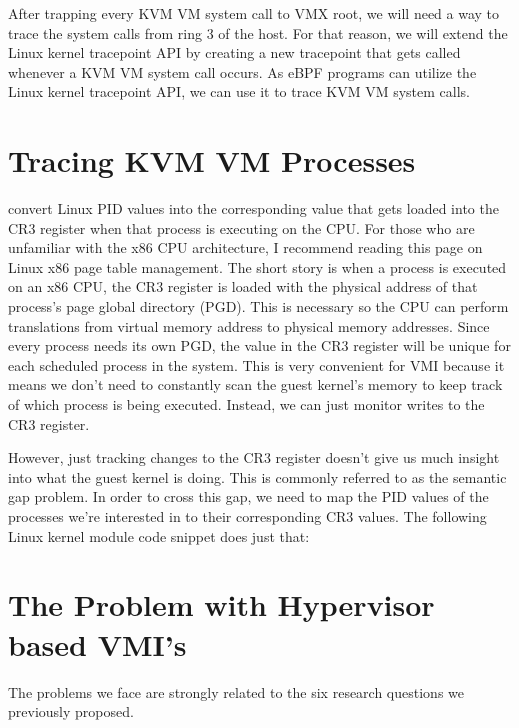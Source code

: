 \documentclass{report}
\begin{document}
\begin{spacing}{1.5}
{\leavevmode\newline
}

{\large
After trapping every KVM VM system call to VMX root, we  will need a way to trace the system calls from ring 3 of the host. For that reason, we will extend the Linux kernel tracepoint API by creating a new tracepoint that gets called whenever a KVM VM system call occurs. As eBPF programs can utilize the Linux kernel tracepoint API, we can use it to trace KVM VM system calls.  
\leavevmode\newline
}





\section{Tracing KVM VM Processes}

{\large
convert Linux PID values into the corresponding value that gets loaded into the CR3 register when that process is executing on the CPU. For those who are unfamiliar with the x86 CPU architecture, I recommend reading this page on Linux x86 page table management. The short story is when a process is executed on an x86 CPU, the CR3 register is loaded with the physical address of that process's page global directory (PGD). This is necessary so the CPU can perform translations from virtual memory address to physical memory addresses. Since every process needs its own PGD, the value in the CR3 register will be unique for each scheduled process in the system. This is very convenient for VMI because it means we don't need to constantly scan the guest kernel's memory to keep track of which process is being executed. Instead, we can just monitor writes to the CR3 register.

However, just tracking changes to the CR3 register doesn't give us much insight into what the guest kernel is doing. This is commonly referred to as the semantic gap problem. In order to cross this gap, we need to map the PID values of the processes we're interested in to their corresponding CR3 values. The following Linux kernel module code snippet does just that:
\newline
}




\section{The Problem with Hypervisor based VMI's}

{\large
The problems we face are strongly related to the six research questions we previously proposed.
\newline
}












\end{spacing}
\end{document}
